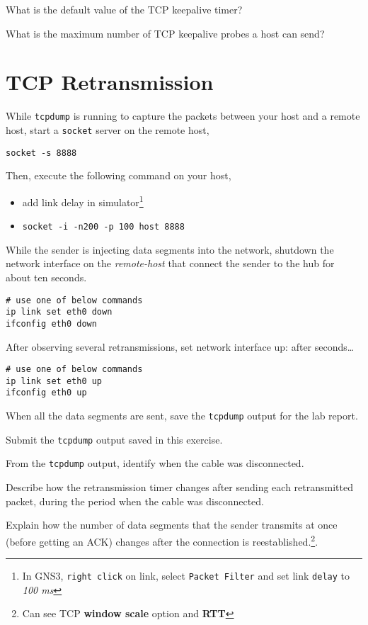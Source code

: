\documentclass{../UTNetLab}
\begin{document}
    \begin{report}
        \item What is the default value of the TCP keepalive timer?
        
        \item What is the maximum number of TCP keepalive probes a host can send?
    \end{report}

\section{TCP Retransmission}
    While \lstinline{tcpdump} is running to capture the packets between your host and a remote host, start a \lstinline{socket} server on the remote host,
    \begin{lstlisting}
socket -s 8888
    \end{lstlisting}
    Then, execute the following command on your host,
    \begin{itemize}
        \item add link delay in simulator\footnote{In GNS3, \lstinline{right click} on link, select \lstinline{Packet Filter} and set link \lstinline{delay} to \textit{100 ms}}
        \item \lstinline[emph={host}]{socket -i -n200 -p 100 host 8888}
    \end{itemize}
    While the sender is injecting data segments into the network, shutdown the network interface on the \textit{remote-host} that connect the sender to the hub for about ten seconds.
    \begin{lstlisting}[emph={eth0}]
# use one of below commands
ip link set eth0 down
ifconfig eth0 down
    \end{lstlisting}

    After observing several retransmissions, set network interface up:
after seconds\ldots
    \begin{lstlisting}[emph={eth0}]
# use one of below commands
ip link set eth0 up
ifconfig eth0 up
    \end{lstlisting} %
    When all the data segments are sent, save the \lstinline{tcpdump} output for the lab report.
    
    \begin{report}
        \item Submit the \lstinline{tcpdump} output saved in this exercise.
        
        \item From the \lstinline{tcpdump} output, identify when the cable was disconnected.
        
        \item Describe how the retransmission timer changes after sending each retransmitted packet, during the period when the cable was disconnected.
        
        \item Explain how the number of data segments that the sender transmits at once (before getting an ACK) changes after the connection is reestablished.\footnote{Can see TCP \textbf{window scale} option and \textbf{RTT}}.
    \end{report}
    
\end{document}
